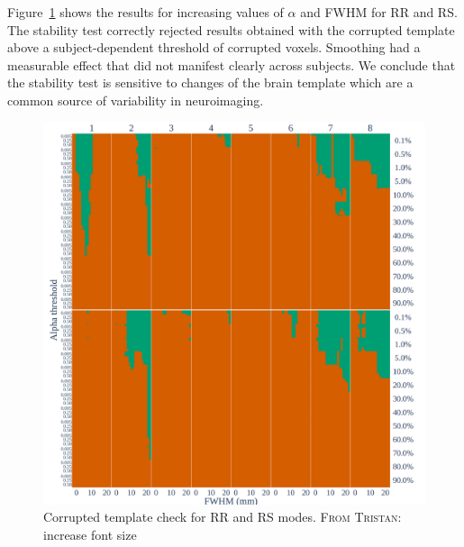 \documentclass[lettersize,journal]{IEEEtran}
\newcommand{\TG}[1]{\color{blue}\textsc{From Tristan:} #1\color{black}\xspace}
\begin{document}
Figure~\ref{fig:template_bonferroni} shows the results for increasing values of $\alpha$ and FWHM for RR and RS. The stability test correctly rejected results obtained with the corrupted template
above a subject-dependent threshold of corrupted voxels. Smoothing had a measurable effect that did not manifest clearly across subjects. We conclude that the stability test is sensitive to changes of the brain template which are a common source of variability in neuroimaging.


\begin{figure}
    \centering
    \includegraphics[width=\linewidth]{figures/template/template_fwe_bonferroni.pdf}
    \caption{Corrupted template check for RR and RS modes. \TG{increase font size}}
    \label{fig:template_bonferroni}
\end{figure}
\end{document}
